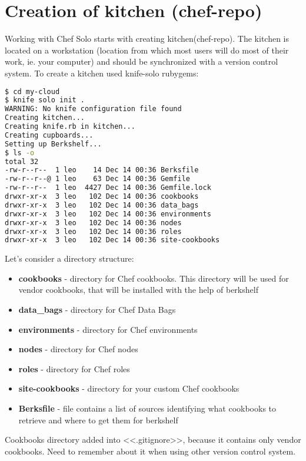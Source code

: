 \section{Creation of kitchen (chef-repo)}

Working with Chef Solo starts with creating kitchen(chef-repo). The kitchen is located on a workstation (location from which most users will do most of their work, ie. your computer) and should be synchronized with a version control system. To create a kitchen used knife-solo rubygems:

\begin{lstlisting}[language=Bash,label=lst:my-cloud-kitchen1,title=my-cloud]
$ cd my-cloud
$ knife solo init .
WARNING: No knife configuration file found
Creating kitchen...
Creating knife.rb in kitchen...
Creating cupboards...
Setting up Berkshelf...
$ ls -o
total 32
-rw-r--r--  1 leo    14 Dec 14 00:36 Berksfile
-rw-r--r--@ 1 leo    63 Dec 14 00:36 Gemfile
-rw-r--r--  1 leo  4427 Dec 14 00:36 Gemfile.lock
drwxr-xr-x  3 leo   102 Dec 14 00:36 cookbooks
drwxr-xr-x  3 leo   102 Dec 14 00:36 data_bags
drwxr-xr-x  3 leo   102 Dec 14 00:36 environments
drwxr-xr-x  3 leo   102 Dec 14 00:36 nodes
drwxr-xr-x  3 leo   102 Dec 14 00:36 roles
drwxr-xr-x  3 leo   102 Dec 14 00:36 site-cookbooks
\end{lstlisting}

Let's consider a directory structure:

\begin{itemize}
  \item \textbf{cookbooks} - directory for Chef cookbooks. This directory will be used for vendor cookbooks, that will be installed with the help of berkshelf
  \item \textbf{data\_bags} - directory for Chef Data Bags
  \item \textbf{environments} - directory for Chef environments
  \item \textbf{nodes} - directory for Chef nodes
  \item \textbf{roles} - directory for Chef roles
  \item \textbf{site-cookbooks} - directory for your custom Chef cookbooks
  \item \textbf{Berksfile} - file contains a list of sources identifying what cookbooks to retrieve and where to get them for berkshelf
\end{itemize}

Cookbooks directory added into <<.gitignore>>, because it contains only vendor cookbooks. Need to remember about it when using other version control system.
